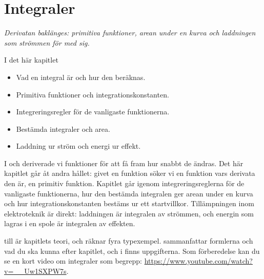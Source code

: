 
\chapter{Integraler}
\label{c14:ch}

{\large\itshape Derivatan baklänges: primitiva funktioner, arean under en kurva och laddningen som
strömmen för med sig.\par}

\begin{chapterbox}{I det här kapitlet}
\begin{itemize}
  \item Vad en integral är och hur den beräknas.
  \item Primitiva funktioner och integrationskonstanten.
  \item Integreringsregler för de vanligaste funktionerna.
  \item Bestämda integraler och area.
  \item Laddning ur ström och energi ur effekt.
\end{itemize}
\end{chapterbox}

I  och  deriverade vi funktioner för att få fram hur snabbt de ändras. Det
här kapitlet går åt andra hållet: givet en funktion söker vi en funktion vars derivata den är, en
primitiv funktion. Kapitlet går igenom integreringsreglerna för de vanligaste funktionerna, hur den
bestämda integralen ger arean under en kurva och hur integrationskonstanten bestäms ur ett
startvillkor. Tillämpningen inom elektroteknik är direkt: laddningen är integralen av strömmen,
och energin som lagras i en spole är integralen av effekten.

 till  är kapitlets teori, och
 räknar fyra typexempel.  sammanfattar
formlerna och vad du ska kunna efter kapitlet, och i  finns uppgifterna.
Som förberedelse kan du se en kort video om integraler som begrepp:
\url{https://www.youtube.com/watch?v=__Uw1SXPW7s}.




